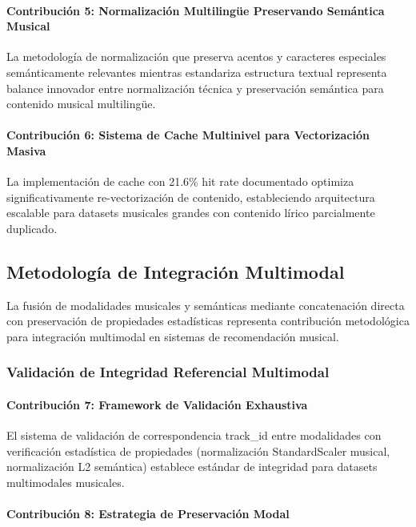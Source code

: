 \documentclass[12pt,a4paper]{report}
\begin{document}
\paragraph{Contribución 5: Normalización Multilingüe Preservando Semántica Musical}

La metodología de normalización que preserva acentos y caracteres especiales semánticamente relevantes mientras estandariza estructura textual representa balance innovador entre normalización técnica y preservación semántica para contenido musical multilingüe.

\paragraph{Contribución 6: Sistema de Cache Multinivel para Vectorización Masiva}

La implementación de cache con 21.6\% hit rate documentado optimiza significativamente re-vectorización de contenido, estableciendo arquitectura escalable para datasets musicales grandes con contenido lírico parcialmente duplicado.

\subsection{Metodología de Integración Multimodal}

La fusión de modalidades musicales y semánticas mediante concatenación directa con preservación de propiedades estadísticas representa contribución metodológica para integración multimodal en sistemas de recomendación musical.

\subsubsection{Validación de Integridad Referencial Multimodal}

\paragraph{Contribución 7: Framework de Validación Exhaustiva}

El sistema de validación de correspondencia track\_id entre modalidades con verificación estadística de propiedades (normalización StandardScaler musical, normalización L2 semántica) establece estándar de integridad para datasets multimodales musicales.

\paragraph{Contribución 8: Estrategia de Preservación Modal}
\end{document}
